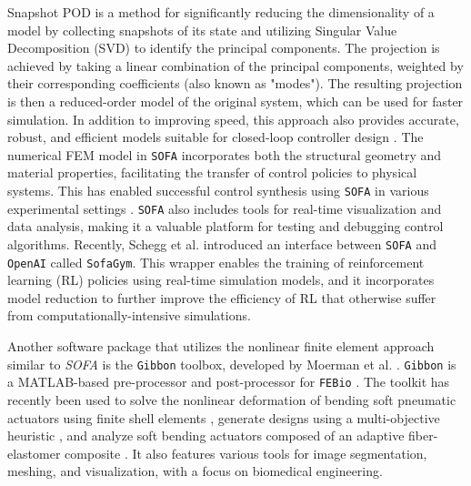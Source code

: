 Snapshot POD \cite{Benner2014,Astrid2008} is a method for significantly reducing the dimensionality of a model by collecting snapshots of its state and utilizing Singular Value Decomposition (SVD) to identify the principal components. The projection is achieved by taking a linear combination of the principal components, weighted by their corresponding coefficients (also known as "modes"). The resulting projection is then a reduced-order model of the original system, which can be used for faster simulation. In addition to improving speed, this approach also provides accurate, robust, and efficient models suitable for closed-loop controller design \cite{Thieffry2019,Wu2021Feb,Alora2022,Tonkens2021May}. The numerical FEM model in \texttt{SOFA} incorporates both the structural geometry and material properties, facilitating the transfer of control policies to physical systems. This has enabled successful control synthesis using \texttt{SOFA} in various experimental settings \cite{Wu2021Feb, Katzschmann2019Apr}. \texttt{SOFA} also includes tools for real-time visualization and data analysis, making it a valuable platform for testing and debugging control algorithms. Recently, Schegg et al. \cite{Schegg2022} introduced an interface between \texttt{SOFA} and \texttt{OpenAI} called \texttt{SofaGym}. This wrapper enables the training of reinforcement learning (RL) policies using real-time simulation models, and it incorporates model reduction to further improve the efficiency of RL that otherwise suffer from computationally-intensive simulations.

Another software package that utilizes the nonlinear finite element approach similar to \textit{SOFA} is the \texttt{Gibbon} toolbox, developed by Moerman et al. \cite{Moerman2018}. \texttt{Gibbon} is a MATLAB-based pre-processor and post-processor for \texttt{FEBio} \cite{Maas2012}. The toolkit has recently been used to solve the nonlinear deformation of bending soft pneumatic actuators using finite shell elements \cite{Smith2022_FEM}, generate designs using a multi-objective heuristic \cite{Smith2022}, and analyze soft bending actuators composed of an adaptive fiber-elastomer composite \cite{Kamble2022Jan}. It also features various tools for image segmentation, meshing, and visualization, with a focus on biomedical engineering.

